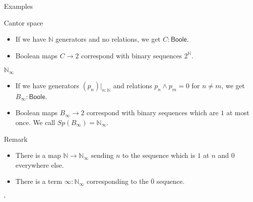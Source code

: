 \documentclass{beamer}
\newcommand{\Boole}{\mathsf{Boole}}
\begin{document}
\begin{frame}{Examples}
  \begin{exampleblock}{Cantor space}
    \begin{itemize}
      \item 
    If we have $\mathbb N$ generators and no relations, we get $C : \Boole$.
    \pause
  \item 
    Boolean maps $C \to 2$ correspond with \pause binary sequences $2^\mathbb N$.
    \end{itemize}
  \end{exampleblock}
  \pause
  \begin{exampleblock}{$\mathbb N_\infty$}
    \begin{itemize}
      \item 
    If we have generators $(p_n)|_{n:\mathbb N}$ and relations $p_n \wedge p_m = 0$ for 
    $n \neq m$, we get $B_\infty:\Boole$. 
    \item 
    \pause
    Boolean maps $B_\infty \to 2$ correspond with \pause 
    binary sequences which are $1$ at most once.
    \pause
    We call $Sp(B_\infty) = \mathbb N_\infty$. 
    \end{itemize}
  \end{exampleblock}
  \pause
  \begin{block}{Remark}
    \begin{itemize}
      \item 
    There is a map $\mathbb N \to \mathbb N_\infty$ sending $n$ to the sequence which is $1$ at $n$ and $0$ everywhere else. 
    \pause
      \item 
    There is a term $\infty:\mathbb N_\infty$ corresponding to the $\overline 0$ sequence. 
    \end{itemize}
  \end{block}`
\end{frame}
\end{document}
